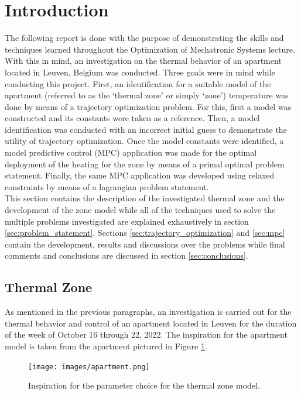 \section{Introduction}
\label{sec:intro}
The following report is done with the purpose of demonstrating the skills and techniques learned throughout the Optimization of Mechatronic Systems lecture. With this in mind, an investigation on the thermal behavior of an apartment located in Leuven, Belgium was conducted. Three goals were in mind while conducting this project. First, an identification for a suitable model of the apartment (referred to as the `thermal zone' or simply `zone') temperature was done by means of a trajectory optimization problem. For this, first a model was constructed and its constants were taken as a reference. Then, a model identification was conducted with an incorrect initial guess to demonstrate the utility of trajectory optimization. Once the model constants were identified, a model predictive control (MPC) application was made for the optimal deployment of the heating for the zone by means of a primal optimal problem statement. Finally, the same MPC application was developed using relaxed constraints by means of a lagrangian problem statement. \\

This section contains the description of the investigated thermal zone and the development of the zone model while all of the techniques used to solve the multiple problems investigated are explained exhaustively in section \ref{sec:problem_statement}. Sections \ref{sec:trajectory_optimization} and \ref{sec:mpc} contain the development, results and discussions over the problems while final comments and conclusions are discussed in section \ref{sec:conclusions}.

\subsection{Thermal Zone}
\label{subsec:thermal_zone}
As mentioned in the previous paragraphs, an investigation is carried out for the thermal behavior and control of an apartment located in Leuven for the duration of the week of October 16 through 22, 2022. The inspiration for the apartment model is taken from the apartment pictured in Figure \ref{fig:apartment}.

\begin{figure}[H]
\centering
\texttt{[image: images/apartment.png]}
\caption{Inspiration for the parameter choice for the thermal zone model.}
\label{fig:apartment}
\end{figure}

